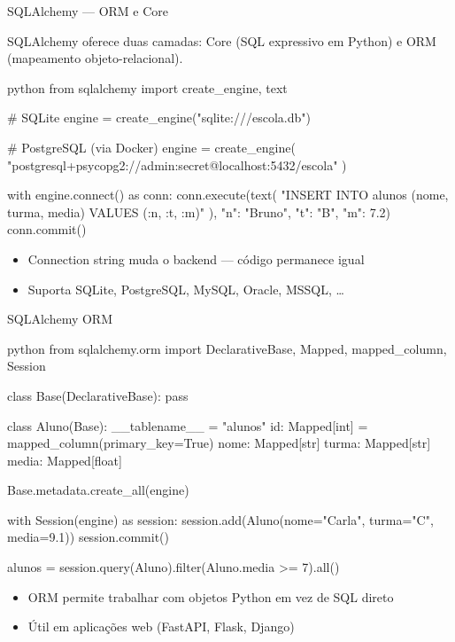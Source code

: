 \documentclass[xcolor=dvipsnames,t,aspectratio=169]{beamer}
\newcommand{\highlight}[1]{{\color{nes_dark_orange} #1}}
\begin{document}
\begin{frame}[c, fragile]{SQLAlchemy — ORM e Core}

SQLAlchemy oferece duas camadas: \highlight{Core} (SQL expressivo em Python) e \highlight{ORM} (mapeamento objeto-relacional).

\begin{code}{python}
from sqlalchemy import create_engine, text

# SQLite
engine = create_engine("sqlite:///escola.db")

# PostgreSQL (via Docker)
engine = create_engine(
    "postgresql+psycopg2://admin:secret@localhost:5432/escola"
)

with engine.connect() as conn:
    conn.execute(text(
        "INSERT INTO alunos (nome, turma, media) VALUES (:n, :t, :m)"
    ), {"n": "Bruno", "t": "B", "m": 7.2})
    conn.commit()
\end{code}

\begin{itemize}
    \item \highlight{Connection string} muda o backend — código permanece igual
    \item Suporta SQLite, PostgreSQL, MySQL, Oracle, MSSQL, \ldots
\end{itemize}

\end{frame}


\begin{frame}[c, fragile]{SQLAlchemy ORM}

\begin{code}{python}
from sqlalchemy.orm import DeclarativeBase, Mapped, mapped_column, Session

class Base(DeclarativeBase): pass

class Aluno(Base):
    __tablename__ = "alunos"
    id:    Mapped[int]   = mapped_column(primary_key=True)
    nome:  Mapped[str]
    turma: Mapped[str]
    media: Mapped[float]

Base.metadata.create_all(engine)

with Session(engine) as session:
    session.add(Aluno(nome="Carla", turma="C", media=9.1))
    session.commit()

    alunos = session.query(Aluno).filter(Aluno.media >= 7).all()
\end{code}

\begin{itemize}
    \item ORM permite trabalhar com \highlight{objetos Python} em vez de SQL direto
    \item Útil em aplicações web (FastAPI, Flask, Django)
\end{itemize}

\end{frame}
\end{document}
